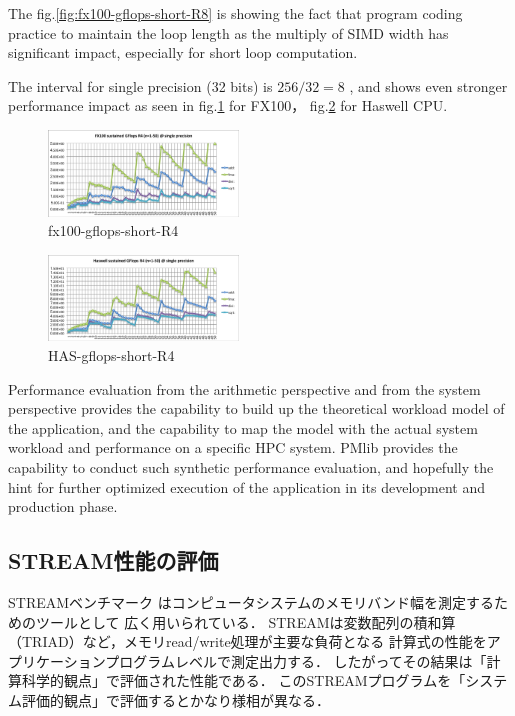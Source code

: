 \documentclass[conference]{IEEEtran}
\begin{document}
The fig.\ref{fig:fx100-gflops-short-R8} is showing the fact that
program coding practice to maintain the loop length as the multiply of
SIMD width has significant impact, especially for short loop computation.

The interval for single precision (32 bits) is
\begin{math}
256 / 32 = 8
\end{math}
, and shows even stronger performance impact as seen in 
fig.\ref{fig:fx100-gflops-short-R4} for FX100，
fig.\ref{fig:HAS-gflops-short-R4} for Haswell CPU.

\begin{figure}[bt]
\centering
\includegraphics[width=0.45\textwidth]{figs/fx100-gflops-short-R4.pdf}
\caption{fx100-gflops-short-R4}
\label{fig:fx100-gflops-short-R4}
\end{figure}


\begin{figure}[bt]
\centering
\includegraphics[width=0.45\textwidth]{figs/HAS-gflops-short-R4.pdf}
\caption{HAS-gflops-short-R4}
\label{fig:HAS-gflops-short-R4}
\end{figure}

Performance evaluation from the arithmetic perspective and from the
system perspective provides the capability to build up the theoretical
workload model of the application,
and the capability to map the model with the actual system workload
and performance on a specific HPC system.
PMlib provides the capability to conduct such synthetic performance
evaluation, and hopefully the hint for further optimized execution of
the application in its development and production phase.


\subsection{STREAM性能の評価}
STREAMベンチマーク\cite{stream:1995}
はコンピュータシステムのメモリバンド幅を測定するためのツールとして
広く用いられている．
STREAMは変数配列の積和算（TRIAD）など，メモリread/write処理が主要な負荷となる
計算式の性能をアプリケーションプログラムレベルで測定出力する．
したがってその結果は「計算科学的観点」で評価された性能である．
このSTREAMプログラムを「システム評価的観点」で評価するとかなり様相が異なる．
\end{document}
